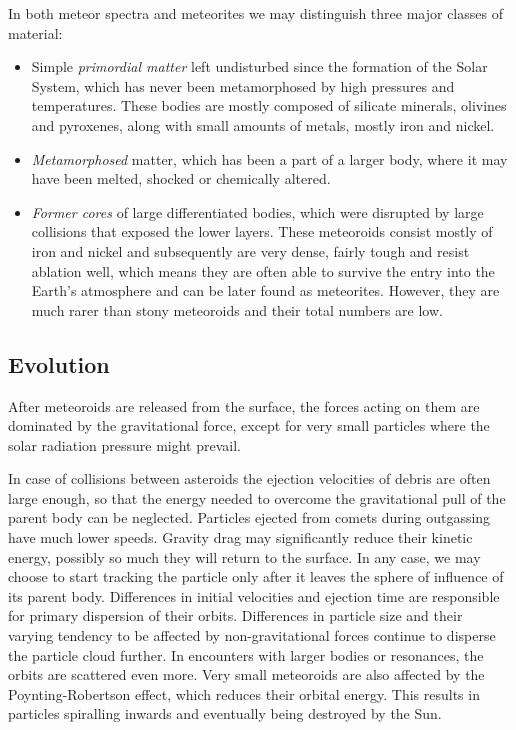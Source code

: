             In both meteor spectra and meteorites we may distinguish three major classes of material:
            \begin{itemize}
                \item Simple \emph{primordial matter} left undisturbed since the formation of the Solar System,
                    which has never been metamorphosed by high pressures and temperatures.
                    These bodies are mostly composed of silicate minerals, olivines and pyroxenes,
                    along with small amounts of metals, mostly iron and nickel.
                \item \emph{Metamorphosed} matter, which has been a part of a larger body,
                    where it may have been melted, shocked or chemically altered.
                \item \emph{Former cores} of large differentiated bodies, which were disrupted by large collisions
                    that exposed the lower layers.
                    These meteoroids consist mostly of iron and nickel and subsequently are very dense,
                    fairly tough and resist ablation well, which means they are often able to
                    survive the entry into the Earth's atmosphere and can be later found as meteorites.
                    However, they are much rarer than stony meteoroids and their total numbers are low.
            \end{itemize}

        \subsection{Evolution} \label{iamf}
            After meteoroids are released from the surface, the forces acting on them are dominated
            by the gravitational force, except for very small particles where the solar radiation pressure
            might prevail.

            In case of collisions between asteroids the ejection velocities of debris are often large enough,
            so that the energy needed to overcome the gravitational pull of the parent body can be neglected.
            Particles ejected from comets during outgassing have much lower speeds.
            Gravity drag may significantly reduce their kinetic energy, possibly so much they will return to the surface.
            In any case, we may choose to start tracking the particle only after it leaves the sphere of influence of its parent body.
            Differences in initial velocities and ejection time are responsible
            for primary dispersion of their orbits. Differences in particle size and their varying tendency
            to be affected by non-gravitational forces continue to disperse the particle cloud further.
            In encounters with larger bodies or resonances, the orbits are scattered even more.
            Very small meteoroids are also affected by the Poynting-Robertson effect, which
            reduces their orbital energy. This results in particles spiralling inwards and eventually being destroyed by the Sun.

